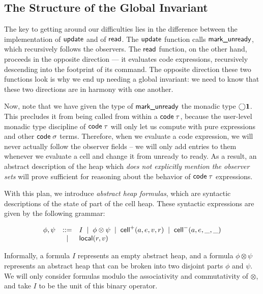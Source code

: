 \documentclass[natbib]{sigplanconf}
\begin{document}
\subsection{The Structure of the Global Invariant}

The key to getting around our difficulties lies in the difference
between the implementation of $\mbox{\textsf{{update}}}$ and of $\mbox{\textsf{{read}}}$.
The $\mbox{\textsf{{update}}}$ function calls $\mbox{\textsf{{mark\_unready}}}$, which 
recursively follows the observers. The $\mbox{\textsf{{read}}}$ function, on the 
other hand, proceeds in the opposite direction --- it evaluates code expressions,
recursively descending into the footprint of its command. The opposite
direction these two functions look is why we end up needing a global
invariant: we need to know that these two directions are in harmony
with one another.

Now, note that we have given the type of $\mbox{\textsf{{mark\_unready}}}$ the
monadic type $\bigcirc{\mathbf{1}}$. This precludes it from being called
from within a $\mbox{\textsf{{code}}}\;{\tau}$, because the user-level monadic type 
discipline of $\mbox{\textsf{{code}}}\;{\tau}$ will only let us compute with pure 
expressions and other $\mbox{\textsf{{code}}}\;{\sigma}$ terms. 
Therefore, when we evaluate a code expression, we will never actually
follow the observer fields -- we will only add entries to them
whenever we evaluate a cell and change it from unready to ready.  As a
result, an abstract description of the heap which \emph{does not
  explicitly mention the observer sets} will prove sufficient for
reasoning about the behavior of $\mbox{\textsf{{code}}}\;{\tau}$ expressions. 

With this plan, we introduce \emph{abstract heap formulas}, which are
syntactic descriptions of the state of part of the cell heap. These
syntactic expressions are given by the following grammar:

\begin{displaymath}
  \begin{array}{lcl}
    \phi,\psi & ::= & I \;\;|\;\; \phi \otimes \psi \;\;|\;\; \mbox{\textsf{{cell}}}^{+}({a}, {e}, {v}, {r}) \;\;|\;\; \mbox{\textsf{{cell}}}^{-}({a}, {e}, {\_}, {\_})\\
         &  |  & \mbox{\textsf{{local}}}({r}, {v}) 
  \end{array}
\end{displaymath}

Informally, a formula $I$ represents an empty abstract heap, and a
formula $\phi \otimes \psi$ represents an abstract heap that can be
broken into two disjoint parts $\phi$ and $\psi$. We will only
consider formulas modulo the associativity and commutativity of
$\otimes$, and take $I$ to be the unit of this binary operator.
\end{document}
